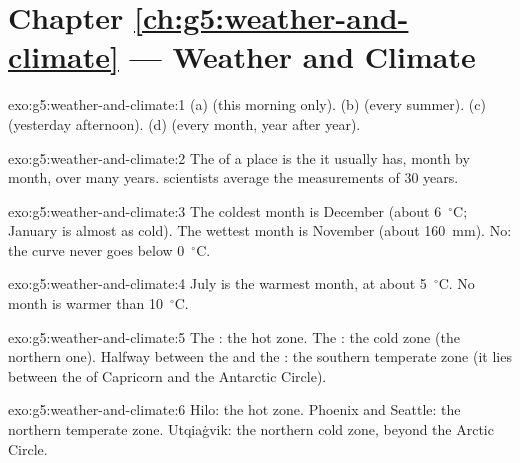 \section*{Chapter \ref{ch:g5:weather-and-climate} --- Weather and Climate}

\begin{solution}{exo:g5:weather-and-climate:1}
(a)  (this morning only). (b)  (every summer). (c) 
(yesterday afternoon). (d)  (every month, year after year).
\end{solution}

\begin{solution}{exo:g5:weather-and-climate:2}
The  of a place is the  it usually has, month by month, over
many years.  scientists average the measurements of 30 years.
\end{solution}

\begin{solution}{exo:g5:weather-and-climate:3}
The coldest month is December (about 6~$^\circ$C; January is almost as
cold). The wettest month is November (about 160~mm). No: the curve never
goes below 0~$^\circ$C.
\end{solution}

\begin{solution}{exo:g5:weather-and-climate:4}
July is the warmest month, at about 5~$^\circ$C. No month is warmer than
10~$^\circ$C.
\end{solution}

\begin{solution}{exo:g5:weather-and-climate:5}
The : the hot zone. The : the cold zone (the northern
one). Halfway between the  and the : the southern
temperate zone (it lies between the  of Capricorn and the Antarctic
Circle).
\end{solution}

\begin{solution}{exo:g5:weather-and-climate:6}
Hilo: the hot zone. Phoenix and Seattle: the northern temperate zone.
Utqiaġvik: the northern cold zone, beyond the Arctic Circle.
\end{solution}

